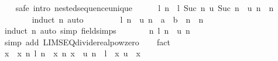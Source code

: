 \begin{isabellebody}
\ \ \isamarkupfalse%
\ {\isacharparenleft}{\kern0pt}safe\ intro{\isacharbang}{\kern0pt}{\isacharcolon}{\kern0pt}\ nested{\isacharunderscore}{\kern0pt}sequence{\isacharunderscore}{\kern0pt}unique{\isacharparenright}{\kern0pt}\isanewline
\ \ \ \ \isamarkupfalse%
\ {\isachardoublequoteopen}l\ n\ {\isasymle}\ l\ {\isacharparenleft}{\kern0pt}Suc\ n{\isacharparenright}{\kern0pt}{\isachardoublequoteclose}\ {\isachardoublequoteopen}u\ {\isacharparenleft}{\kern0pt}Suc\ n{\isacharparenright}{\kern0pt}\ {\isasymle}\ u\ n{\isachardoublequoteclose}\ \ n\isanewline
\ \ \ \ \ \ \isamarkupfalse%
\ {\isacharparenleft}{\kern0pt}induct\ n{\isacharparenright}{\kern0pt}\ auto\isanewline
\ \ \isamarkupfalse%
\isanewline
\ \ \ \ \isamarkupfalse%
\ {\isachardoublequoteopen}l\ n\ {\isacharminus}{\kern0pt}\ u\ n\ {\isacharequal}{\kern0pt}\ {\isacharparenleft}{\kern0pt}a\ {\isacharminus}{\kern0pt}\ b{\isacharparenright}{\kern0pt}\ {\isacharslash}{\kern0pt}\ {}{\isacharcircum}{\kern0pt}n{\isachardoublequoteclose}\ \ n\isanewline
\ \ \ \ \ \ \isamarkupfalse%
\ {\isacharparenleft}{\kern0pt}induct\ n{\isacharparenright}{\kern0pt}\ {\isacharparenleft}{\kern0pt}auto\ simp{\isacharcolon}{\kern0pt}\ field{\isacharunderscore}{\kern0pt}simps{\isacharparenright}{\kern0pt}\isanewline
\ \ \ \ \isamarkupfalse%
\ \isamarkupfalse%
\ {\isachardoublequoteopen}{\isacharparenleft}{\kern0pt}{\isasymlambda}n{\isachardot}{\kern0pt}\ l\ n\ {\isacharminus}{\kern0pt}\ u\ n{\isacharparenright}{\kern0pt}\ {\isasymlonglonglongrightarrow}\ {}{\isachardoublequoteclose}\isanewline
\ \ \ \ \ \ \isamarkupfalse%
\ {\isacharparenleft}{\kern0pt}simp\ add{\isacharcolon}{\kern0pt}\ LIMSEQ{\isacharunderscore}{\kern0pt}divide{\isacharunderscore}{\kern0pt}realpow{\isacharunderscore}{\kern0pt}zero{\isacharparenright}{\kern0pt}\isanewline
\ \ \isamarkupfalse%
\ fact\isanewline
\ \ \isamarkupfalse%
\ \isamarkupfalse%
\ x\ \ x{\isacharcolon}{\kern0pt}\ {\isachardoublequoteopen}{\isasymAnd}n{\isachardot}{\kern0pt}\ l\ n\ {\isasymle}\ x{\isachardoublequoteclose}\ {\isachardoublequoteopen}{\isasymAnd}n{\isachardot}{\kern0pt}\ x\ {\isasymle}\ u\ n{\isachardoublequoteclose}\ \ {\isachardoublequoteopen}l\ {\isasymlonglonglongrightarrow}\ x{\isachardoublequoteclose}\ {\isachardoublequoteopen}u\ {\isasymlonglonglongrightarrow}\ x{\isachardoublequoteclose}\isanewline

\end{isabellebody}
